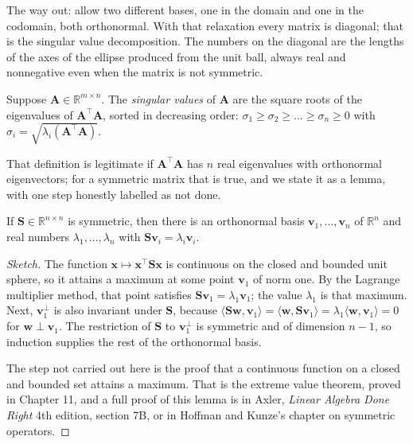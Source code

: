The way out: allow two different bases, one in the domain and one in the codomain,
both orthonormal. With that relaxation every matrix is diagonal; that is the
singular value decomposition. The numbers on the diagonal are the lengths of the axes of the ellipse
produced from the unit ball, always real and nonnegative even when the matrix is not
symmetric.


\begin{definisi}
Suppose $\mathbf{A}\in\mathbb{R}^{m\times n}$. The \emph{singular values} of $\mathbf{A}$
are the square roots of the eigenvalues of $\mathbf{A}^{\top}\mathbf{A}$, sorted in decreasing order:
$\sigma_{1}\ge\sigma_{2}\ge\dots\ge\sigma_{n}\ge0$ with
$\sigma_{i}=\sqrt{\lambda_{i}(\mathbf{A}^{\top}\mathbf{A})}$.
\end{definisi}

That definition is legitimate if $\mathbf{A}^{\top}\mathbf{A}$ has $n$ real eigenvalues with
orthonormal eigenvectors; for a symmetric matrix that is true, and we state it as a
lemma, with one step honestly labelled as not done.

\begin{lemma}
If $\mathbf{S}\in\mathbb{R}^{n\times n}$ is symmetric, then there is an orthonormal basis
$\mathbf{v}_{1},\dots,\mathbf{v}_{n}$ of $\mathbb{R}^{n}$ and real numbers
$\lambda_{1},\dots,\lambda_{n}$ with $\mathbf{S}\mathbf{v}_{i}=\lambda_{i}\mathbf{v}_{i}$.
\end{lemma}

\begin{proof}[Sketch]
The function $\mathbf{x}\mapsto\mathbf{x}^{\top}\mathbf{S}\mathbf{x}$ is continuous on the closed
and bounded unit sphere, so it attains a maximum at some point
$\mathbf{v}_{1}$ of norm one. By the Lagrange multiplier method, that point satisfies
$\mathbf{S}\mathbf{v}_{1}=\lambda_{1}\mathbf{v}_{1}$; the value $\lambda_{1}$ is that
maximum. Next, $\mathbf{v}_{1}^{\perp}$ is also invariant under $\mathbf{S}$, because
$\langle\mathbf{S}\mathbf{w},\mathbf{v}_{1}\rangle
=\langle\mathbf{w},\mathbf{S}\mathbf{v}_{1}\rangle
=\lambda_{1}\langle\mathbf{w},\mathbf{v}_{1}\rangle=0$ for $\mathbf{w}\perp\mathbf{v}_{1}$.
The restriction of $\mathbf{S}$ to $\mathbf{v}_{1}^{\perp}$ is symmetric and of dimension $n-1$, so
induction supplies the rest of the orthonormal basis.

The step not carried out here is the proof that a continuous function on a closed and bounded set
attains a maximum. That is the extreme value theorem, proved in Chapter 11,
and a full proof of this lemma is in Axler, \emph{Linear Algebra Done Right} 4th edition,
section 7B, or in Hoffman and Kunze's chapter on symmetric operators.
\end{proof}

